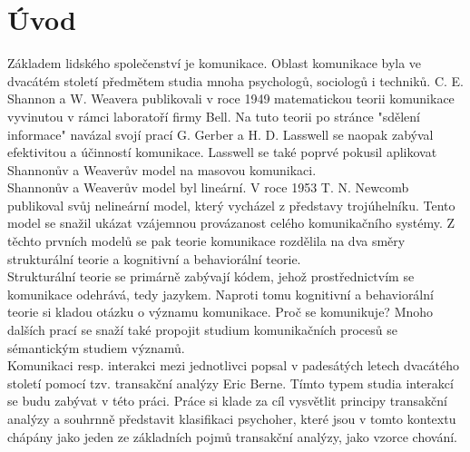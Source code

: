 \chapter{Úvod}

Základem lidského společenství je komunikace. 
Oblast komunikace byla ve dvacátém století předmětem studia mnoha psychologů, sociologů i techniků.
C. E. Shannon a W. Weavera publikovali v roce 1949 matematickou teorii komunikace vyvinutou v rámci laboratoří firmy Bell.  
Na tuto teorii po stránce "sdělení informace" navázal svojí prací G. Gerber a H. D. Lasswell se naopak zabýval efektivitou a účinností komunikace. 
Lasswell se také poprvé pokusil aplikovat Shannonův a Weaverův model na masovou komunikaci.\cite{teorie_komunikace_slovnik}\\

Shannonův a Weaverův model byl lineární. V roce 1953 T. N. Newcomb publikoval svůj nelineární model, který vycházel z představy trojúhelníku. Tento model se snažil ukázat vzájemnou provázanost celého komunikačního systémy. Z těchto prvních modelů se pak teorie komunikace rozdělila na dva směry strukturální teorie a kognitivní a behaviorální teorie.\cite{teorie_komunikace_slovnik}\\

Strukturální teorie se primárně zabývají kódem, jehož prostřednictvím se komunikace odehrává, tedy jazykem. Naproti tomu kognitivní a behaviorální teorie si kladou otázku o významu komunikace. Proč se komunikuje? Mnoho dalších prací se snaží také propojit studium komunikačních procesů se sémantickým studiem významů. \cite{teorie_komunikace_slovnik}\\

Komunikaci resp. interakci mezi jednotlivci popsal v padesátých letech dvacátého století pomocí tzv. transakční analýzy Eric Berne.
Tímto typem studia interakcí se budu zabývat v této práci.
Práce si klade za cíl vysvětlit principy transakční analýzy a souhrnně představit klasifikaci psychoher, které jsou v tomto kontextu chápány jako jeden ze základních pojmů transakční analýzy, jako vzorce chování.

